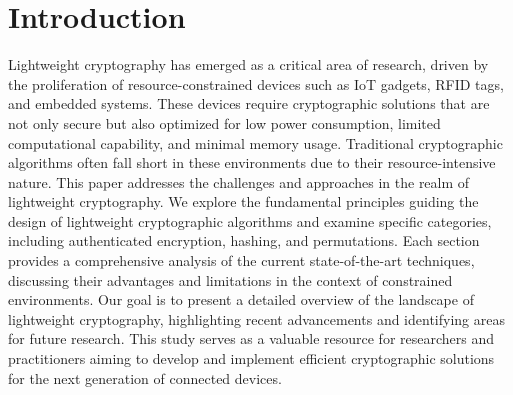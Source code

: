 \section{Introduction}
Lightweight cryptography has emerged as a critical area of research, driven by the proliferation of resource-constrained devices such as IoT gadgets, RFID tags, and embedded systems. These devices require cryptographic solutions that are not only secure but also optimized for low power consumption, limited computational capability, and minimal memory usage. Traditional cryptographic algorithms often fall short in these environments due to their resource-intensive nature.
\newline
This paper addresses the challenges and approaches in the realm of lightweight cryptography. We explore the fundamental principles guiding the design of lightweight cryptographic algorithms and examine specific categories, including authenticated encryption, hashing, and permutations. Each section provides a comprehensive analysis of the current state-of-the-art techniques, discussing their advantages and limitations in the context of constrained environments.
\newline
Our goal is to present a detailed overview of the landscape of lightweight cryptography, highlighting recent advancements and identifying areas for future research. This study serves as a valuable resource for researchers and practitioners aiming to develop and implement efficient cryptographic solutions for the next generation of connected devices.
